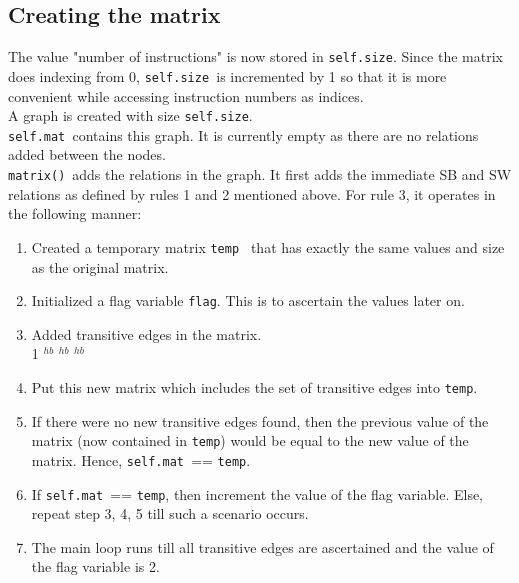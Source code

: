\documentclass{article}
\newcommand{\var}[1]{\color{OliveGreen} \texttt{#1}\color{black}}
\newcommand{\fun}[2]{\color{Sepia}\texttt{#1(\color{Gray}\textit{#2}\color{Sepia})}\color{black}}
\newcommand{\hb}[2]{{#1} {\color{OliveGreen}\rightarrow$^{hb}$} \color{black}{#2}}
\begin{document}
\subsection{Creating the matrix}
The value "number of instructions" is now stored in \var{self.size}. Since the matrix does indexing from 0, \var{self.size }is incremented by 1 so that it is more convenient while accessing instruction numbers as indices.\\

A graph is created with size \var{self.size}.\\
\var{self.mat }contains this graph. It is currently empty as there are no relations added between the nodes.\\

\fun{matrix}{}\ adds the relations in the graph. It first adds the immediate SB and SW relations as defined by rules 1 and 2 mentioned above. For rule 3, it operates in the following manner:
\begin{enumerate}
    \item Created a temporary matrix \var{temp } that has exactly the same values and size as the original matrix.
    \item Initialized a flag variable \var{flag}. This is to ascertain the values later on.
    \item Added transitive edges in the matrix.\\
    \hb{\hb{1}{2}}{3} \implies \hb{1}{3}
    \item Put this new matrix which includes the set of transitive edges into \var{temp}.
    \item If there were no new transitive edges found, then the previous value of the matrix (now contained in \var{temp}) would be equal to the new value of the matrix. Hence, \var{self.mat }== \var{temp}.
    \item If \var{self.mat }== \var{temp}, then increment the value of the flag variable. Else, repeat step 3, 4, 5 till such a scenario occurs.
    \item The main loop runs till all transitive edges are ascertained and the value of the flag variable is 2.

\end{enumerate}
\end{document}
